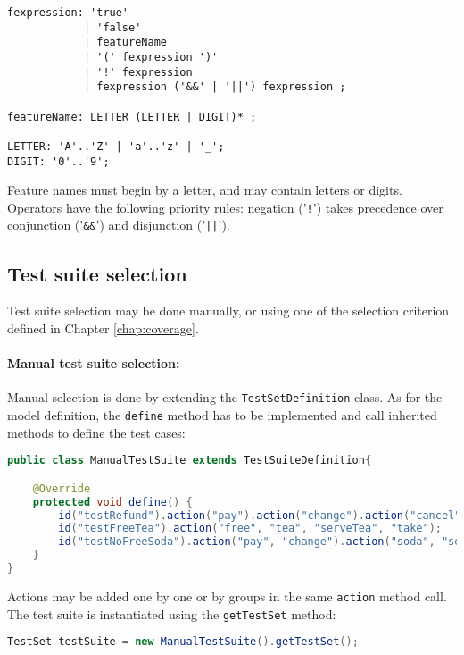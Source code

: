 %
\begin{lstlisting}[frame=single,numbers=none]
fexpression: 'true'
			| 'false'
			| featureName
			| '(' fexpression ')'
			| '!' fexpression
			| fexpression ('&&' | '||') fexpression ;

featureName: LETTER (LETTER | DIGIT)* ;

LETTER: 'A'..'Z' | 'a'..'z' | '_';
DIGIT: '0'..'9';
\end{lstlisting}
%
Feature names must begin by a letter, and may contain letters or digits. Operators have the following priority rules: negation ('\texttt{!}') takes precedence over conjunction ('\texttt{\&\&}') and disjunction ('\texttt{||}').

\subsection{Test suite selection}

Test suite selection may be done manually, or using one of the selection criterion defined in Chapter \ref{chap:coverage}. 

\paragraph{Manual test suite selection:}

Manual selection is done by extending the \texttt{Test\-Set\-De\-fi\-ni\-tion} class. As for the model definition, the \texttt{define} method has to be implemented and call inherited methods to define the test cases:
%
\begin{lstlisting}[language=Java,frame=single,numbers=none]
public class ManualTestSuite extends TestSuiteDefinition{

    @Override
    protected void define() {
        id("testRefund").action("pay").action("change").action("cancel").action("return").end();
        id("testFreeTea").action("free", "tea", "serveTea", "take");
        id("testNoFreeSoda").action("pay", "change").action("soda", "serveSoda").action("open", "take", "close");
    }
}
\end{lstlisting}
%
Actions may be added one by one or by groups in the same \texttt{action} method call. The test suite is instantiated using the \texttt{getTestSet} method:
%
\begin{lstlisting}[language=Java,frame=single,numbers=none]
TestSet testSuite = new ManualTestSuite().getTestSet();
\end{lstlisting}
%



